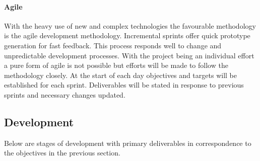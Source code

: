 \documentclass[a4paper, 11pt]{article}
\begin{document}
  \vspace{\baselineskip}

\paragraph{Agile}With the heavy use of new and complex technologies the favourable methodology is the agile development methodology. Incremental sprints offer quick prototype generation for fast feedback. This process responds well to change and unpredictable development processes. With the project being an individual effort a pure form of agile is not possible but efforts will be made to follow the methodology closely. At the start of each day objectives and targets will be established for each sprint. Deliverables will be stated in response to previous sprints and necessary changes updated.

\subsection{Development}
Below are stages of development with primary deliverables in correspondence to the objectives in the previous section.
\end{document}
